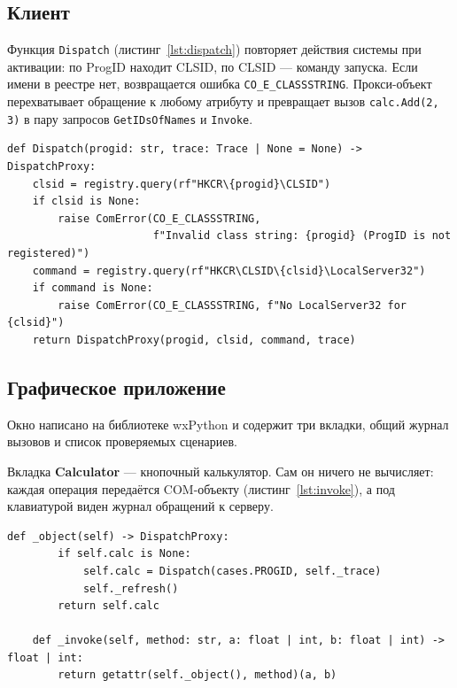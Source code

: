\documentclass[14pt,a4paper]{extarticle}
\begin{document}
\subsection{Клиент}

Функция \texttt{Dispatch} (листинг~\ref{lst:dispatch}) повторяет действия системы при
активации: по ProgID находит CLSID, по CLSID --- команду запуска. Если имени в реестре
нет, возвращается ошибка \texttt{CO\_E\_CLASSSTRING}. Прокси-объект перехватывает
обращение к любому атрибуту и превращает вызов \texttt{calc.Add(2, 3)} в пару запросов
\texttt{GetIDsOfNames} и \texttt{Invoke}.

\begin{lstlisting}[style=python, caption={Активация объекта по имени}, label={lst:dispatch}]
def Dispatch(progid: str, trace: Trace | None = None) -> DispatchProxy:
    clsid = registry.query(rf"HKCR\{progid}\CLSID")
    if clsid is None:
        raise ComError(CO_E_CLASSSTRING,
                       f"Invalid class string: {progid} (ProgID is not registered)")
    command = registry.query(rf"HKCR\CLSID\{clsid}\LocalServer32")
    if command is None:
        raise ComError(CO_E_CLASSSTRING, f"No LocalServer32 for {clsid}")
    return DispatchProxy(progid, clsid, command, trace)
\end{lstlisting}

\subsection{Графическое приложение}

Окно написано на библиотеке wxPython и содержит три вкладки, общий журнал вызовов и
список проверяемых сценариев.

Вкладка \textbf{Calculator} --- кнопочный калькулятор. Сам он ничего не вычисляет:
каждая операция передаётся COM-объекту (листинг~\ref{lst:invoke}), а под клавиатурой
виден журнал обращений к серверу.

\begin{lstlisting}[style=python, caption={Калькулятор делегирует вычисление COM-объекту}, label={lst:invoke}]
    def _object(self) -> DispatchProxy:
        if self.calc is None:
            self.calc = Dispatch(cases.PROGID, self._trace)
            self._refresh()
        return self.calc

    def _invoke(self, method: str, a: float | int, b: float | int) -> float | int:
        return getattr(self._object(), method)(a, b)
\end{lstlisting}
\end{document}
